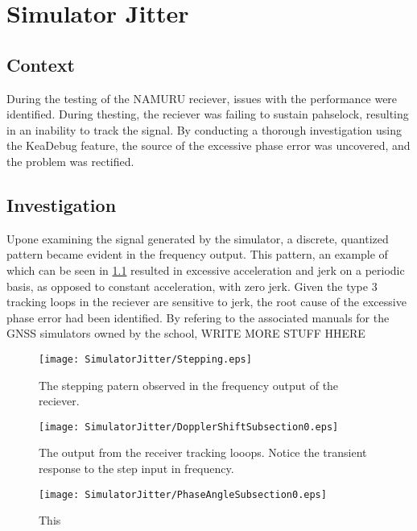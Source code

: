 \label{ch:SimJitter}
\chapter{Simulator Jitter}

\section{Context}
During the testing of the NAMURU reciever, issues with the performance were identified. During thesting, the reciever was failing to sustain pahselock, resulting in an inability to track the signal. By conducting a thorough investigation using the KeaDebug feature, the source of the excessive phase error was uncovered, and the problem was rectified. 

\section{Investigation}

Upone examining the signal generated by the simulator, a discrete, quantized pattern became evident in the frequency output. This pattern, an example of which can be seen in \ref{fig:Stepping} resulted in excessive acceleration and jerk on a periodic basis, as opposed to constant acceleration, with zero jerk. Given the type 3 tracking loops in the reciever are sensitive to jerk, the root cause of the excessive phase error had been identified. By refering to the associated manuals for the GNSS simulators owned by the school, WRITE MORE STUFF HHERE 

\begin{figure}[!htb] 
    \centering
    \texttt{[image: SimulatorJitter/Stepping.eps]} 
    \caption{The stepping patern observed in the frequency output of the reciever.}
    \label{fig:Stepping}
\end{figure}

\begin{figure}[!htb] 
    \centering
    \texttt{[image: SimulatorJitter/DopplerShiftSubsection0.eps]} 
    \caption{The output from the receiver tracking looops. Notice the transient response to the step input in frequency. }
    \label{fig:}
\end{figure}

\begin{figure}[!htb] 
    \centering
    \texttt{[image: SimulatorJitter/PhaseAngleSubsection0.eps]} 
    \caption{This }
    \label{fig:}
\end{figure}

